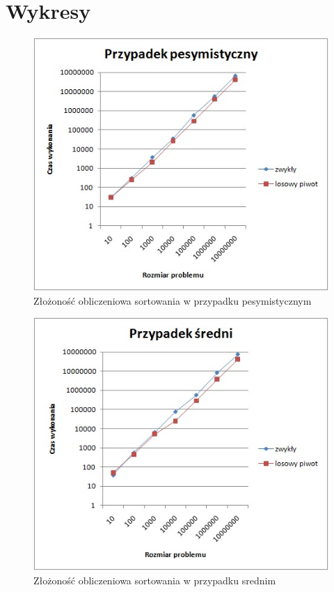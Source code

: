 \documentclass[10pt,oneside]{mwbk}
\begin{document}
\section {Wykresy}
	\begin{figure}[!ht]
	\centering
	\includegraphics[scale=0.7]{rys/pesymistycznie.jpg}
	\caption{ Złożoność obliczeniowa sortowania w przypadku pesymistycznym}
	\end{figure}
	
	\begin{figure}[!h]
	\centering
	\includegraphics[scale=0.7]{rys/srednio.jpg}
	\caption{ Złożoność obliczeniowa sortowania w przypadku srednim}
	\end{figure}
\newpage
\end{document}

